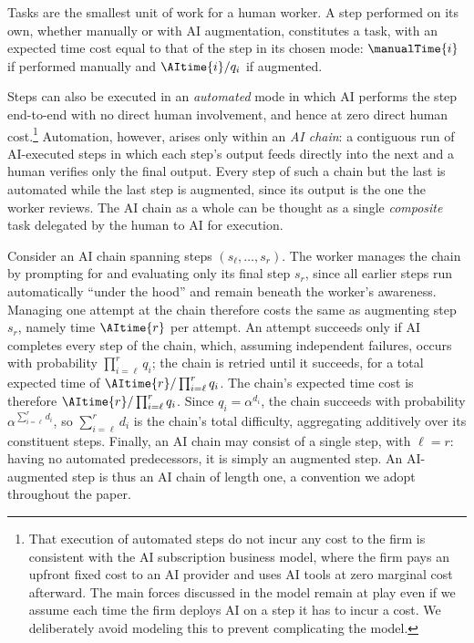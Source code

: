 Tasks are the smallest unit of work for a human worker.
A step performed on its own, whether manually or with AI augmentation, constitutes a task, with an expected time cost equal to that of the step in its chosen mode: $\manualTime{i}$ if performed manually and $\AItime{i}/q_i$ if augmented.

Steps can also be executed in an \emph{automated} mode in which AI performs the step end-to-end with no direct human involvement, and hence at zero direct human cost.\footnote{That execution of automated steps do not incur any cost to the firm is consistent with the AI subscription business model, where the firm pays an upfront fixed cost to an AI provider and uses AI tools at zero marginal cost afterward. The main forces discussed in the model remain at play even if we assume each time the firm deploys AI on a step it has to incur a cost. We deliberately avoid modeling this to prevent complicating the model.}
Automation, however, arises only within an \emph{AI chain}: a contiguous run of AI-executed steps in which each step's output feeds directly into the next and a human verifies only the final output.
Every step of such a chain but the last is automated while the last step is augmented, since its output is the one the worker reviews.
The AI chain as a whole can be thought as a single \emph{composite} task delegated by the human to AI for execution.

Consider an AI chain spanning steps $(s_\ell, \dotsc, s_r)$.
The worker manages the chain by prompting for and evaluating only its final step $s_r$, since all earlier steps run automatically ``under the hood'' and remain beneath the worker's awareness.
Managing one attempt at the chain therefore costs the same as augmenting step $s_r$, namely time $\AItime{r}$ per attempt.
An attempt succeeds only if AI completes every step of the chain, which, assuming independent failures, occurs with probability $\prod_{i=\ell}^{r} q_i$; the chain is retried until it succeeds, for a total expected time of $\AItime{r}/\prod_{i=\ell}^{r} q_i$.
The chain's expected time cost is therefore $\AItime{r}/\prod_{i=\ell}^{r} q_i$.
Since $q_i = \alpha^{d_i}$, the chain succeeds with probability $\alpha^{\sum_{i=\ell}^{r} d_i}$, so $\sum_{i=\ell}^{r} d_i$ is the chain's total difficulty, aggregating additively over its constituent steps.
Finally, an AI chain may consist of a single step, with $\ell = r$: having no automated predecessors, it is simply an augmented step.
An AI-augmented step is thus an AI chain of length one, a convention we adopt throughout the paper.

